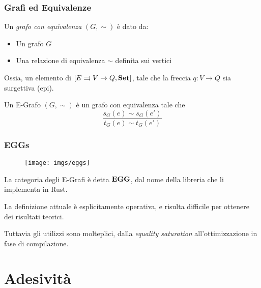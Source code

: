 \documentclass[8pt]{beamer}
\begin{document}
\begin{frame}\frametitle{Grafi ed Equivalenze}
	\begin{wrapfigure}{R}{0.4\textwidth}
	\end{wrapfigure}
	
	Un \emph{grafo con equivalenza} $(G, \sim)$ \`e dato da:
	\begin{itemize}
		\item Un grafo $G$
		\item Una relazione di equivalenza $\sim$ definita sui vertici
	\end{itemize}
	
	Ossia, un elemento di $[E \rightrightarrows V \to Q, \mathbf{Set}]$, tale che la freccia $q: V \to Q$ sia surgettiva (epi).

	Un E-Grafo $(G, \sim)$ \`e un grafo con equivalenza tale che
	\[
		\frac{s_G(e)\sim s_G(e')}{t_G(e) \sim t_G(e')}
	\]
\end{frame}

\begin{frame}\frametitle{EGGs}

	\begin{figure}
		\texttt{[image: imgs/eggs]}
	\end{figure}

	La categoria degli E-Grafi \`e detta $\mathbf{EGG}$, dal nome della libreria che li implementa in Rust.

	\smallskip

	La definizione attuale \`e esplicitamente operativa, e risulta difficile per ottenere dei risultati teorici.

	\smallskip

	Tuttavia gli utilizzi sono molteplici, dalla \emph{equality saturation} all'ottimizzazione in fase di compilazione.
\end{frame}

\section{Adesivit\`a}
\end{document}
